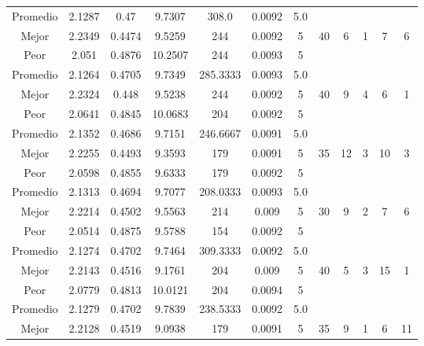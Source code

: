 \begin{table}[h!]
\begin{center}
\begin{tabular}{|c|c|c|c|c|c|c|c|c|c|c|c|}
        \hline
        \hline
            Promedio  & 2.1287 & 0.47 & 9.7307 & 308.0 & 0.0092 & 5.0 &  &  &  &  & \\
            \cline{1-7}
            Mejor & 2.2349 & 0.4474  & 9.5259 & 244 & 0.0092 & 5 & 40 & 6 & 1 & 7 & 6\\
            \cline{1-7}
            Peor & 2.051 & 0.4876  & 10.2507 & 244 & 0.0093 & 5 &  &  &  &  & \\
        \hline
        \hline
            Promedio  & 2.1264 & 0.4705 & 9.7349 & 285.3333 & 0.0093 & 5.0 &  &  &  &  & \\
            \cline{1-7}
            Mejor & 2.2324 & 0.448  & 9.5238 & 244 & 0.0092 & 5 & 40 & 9 & 4 & 6 & 1\\
            \cline{1-7}
            Peor & 2.0641 & 0.4845  & 10.0683 & 204 & 0.0092 & 5 &  &  &  &  & \\
        \hline
        \hline
            Promedio  & 2.1352 & 0.4686 & 9.7151 & 246.6667 & 0.0091 & 5.0 &  &  &  &  & \\
            \cline{1-7}
            Mejor & 2.2255 & 0.4493  & 9.3593 & 179 & 0.0091 & 5 & 35 & 12 & 3 & 10 & 3\\
            \cline{1-7}
            Peor & 2.0598 & 0.4855  & 9.6333 & 179 & 0.0092 & 5 &  &  &  &  & \\
        \hline
        \hline
            Promedio  & 2.1313 & 0.4694 & 9.7077 & 208.0333 & 0.0093 & 5.0 &  &  &  &  & \\
            \cline{1-7}
            Mejor & 2.2214 & 0.4502  & 9.5563 & 214 & 0.009 & 5 & 30 & 9 & 2 & 7 & 6\\
            \cline{1-7}
            Peor & 2.0514 & 0.4875  & 9.5788 & 154 & 0.0092 & 5 &  &  &  &  & \\
        \hline
        \hline
            Promedio  & 2.1274 & 0.4702 & 9.7464 & 309.3333 & 0.0092 & 5.0 &  &  &  &  & \\
            \cline{1-7}
            Mejor & 2.2143 & 0.4516  & 9.1761 & 204 & 0.009 & 5 & 40 & 5 & 3 & 15 & 1\\
            \cline{1-7}
            Peor & 2.0779 & 0.4813  & 10.0121 & 204 & 0.0094 & 5 &  &  &  &  & \\
        \hline
        \hline
            Promedio  & 2.1279 & 0.4702 & 9.7839 & 238.5333 & 0.0092 & 5.0 &  &  &  &  & \\
            \cline{1-7}
            Mejor & 2.2128 & 0.4519  & 9.0938 & 179 & 0.0091 & 5 & 35 & 9 & 1 & 6 & 11\\

\end{tabular}
\end{center}
\end{table}
